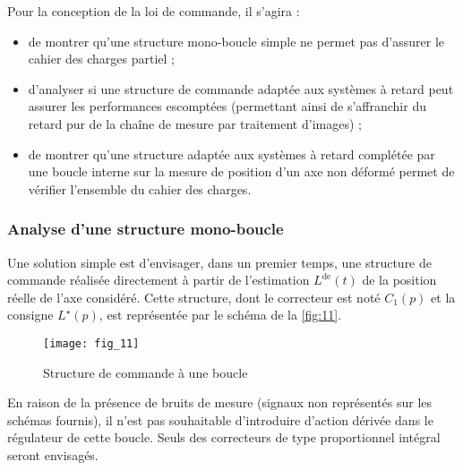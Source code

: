 Pour la conception de la loi de commande, il s’agira :
\begin{itemize}
\item de montrer qu’une structure mono-boucle simple ne permet pas d’assurer le cahier des charges partiel ;
\item d’analyser si une structure de commande adaptée aux systèmes à retard peut assurer les performances
escomptées (permettant ainsi de s’affranchir du retard pur de la chaîne de mesure par traitement d’images) ;
\item de montrer qu’une structure adaptée aux systèmes à retard complétée par une boucle interne sur la mesure
de position d’un axe non déformé permet de vérifier l’ensemble du cahier des charges.
\end{itemize}

\subsubsection{Analyse d’une structure mono-boucle}

Une solution simple est d’envisager, dans un premier temps, une structure de commande réalisée directement à
partir de l’estimation $L^{\text{de}}(t)$ de la position réelle de l’axe considéré. Cette structure, dont le correcteur est noté
$C_1(p)$ et la consigne $L^{\star}(p)$, est représentée par le schéma de la \autoref{fig:11}.


\begin{figure}[H]
\centering
\texttt{[image: fig\_11]}
\caption{\label{fig:11}  Structure de commande à une boucle}
\end{figure}

En raison de la présence de bruits de mesure (signaux non représentés sur les schémas fournis), il n’est pas souhaitable d’introduire d’action dérivée dans le régulateur de cette boucle. Seuls des correcteurs de type proportionnel intégral seront envisagés.

\ifprof
\begin{corrige}
\end{corrige}
\else
\fi



